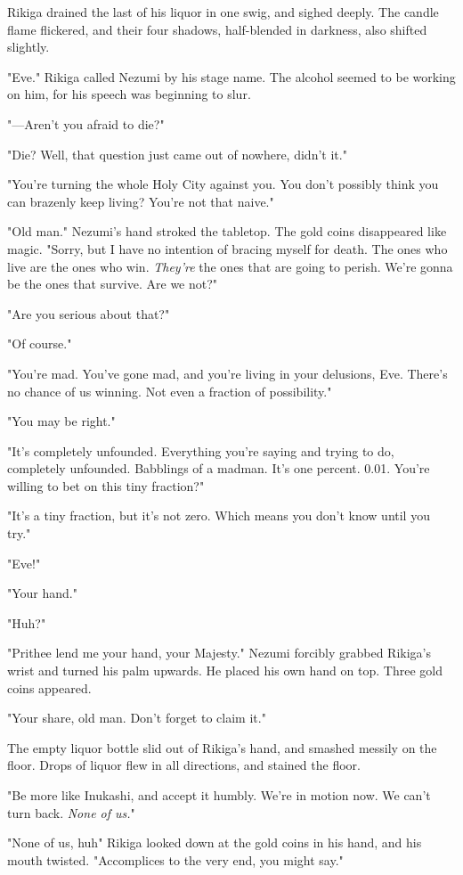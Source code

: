 Rikiga drained the last of his liquor in one swig, and sighed deeply.
The candle flame flickered, and their four shadows, half-blended in
darkness, also shifted slightly.

"Eve." Rikiga called Nezumi by his stage name. The alcohol seemed to be
working on him, for his speech was beginning to slur.

"---Aren't you afraid to die?"

"Die? Well, that question just came out of nowhere, didn't it."

"You're turning the whole Holy City against you. You don't possibly
think you can brazenly keep living? You're not that naive."

"Old man." Nezumi's hand stroked the tabletop. The gold coins
disappeared like magic. "Sorry, but I have no intention of bracing
myself for death. The ones who live are the ones who win. \emph{They're} the
ones that are going to perish. We're gonna be the ones that survive. Are
we not?"

"Are you serious about that?"

"Of course."

"You're mad. You've gone mad, and you're living in your delusions, Eve.
There's no chance of us winning. Not even a fraction of possibility."

"You may be right."

"It's completely unfounded. Everything you're saying and trying to do,
completely unfounded. Babblings of a madman. It's one percent. 0.01.
You're willing to bet on this tiny fraction?"

"It's a tiny fraction, but it's not zero. Which means you don't know
until you try."

"Eve!"

"Your hand."

"Huh?"

"Prithee lend me your hand, your Majesty." Nezumi forcibly grabbed
Rikiga's wrist and turned his palm upwards. He placed his own hand on
top. Three gold coins appeared.

"Your share, old man. Don't forget to claim it."

The empty liquor bottle slid out of Rikiga's hand, and smashed messily
on the floor. Drops of liquor flew in all directions, and stained the
floor.

"Be more like Inukashi, and accept it humbly. We're in motion now. We
can't turn back. \emph{None of us.}"

"None of us, huh\el " Rikiga looked down at the gold coins in his hand,
and his mouth twisted. "Accomplices to the very end, you might say."

